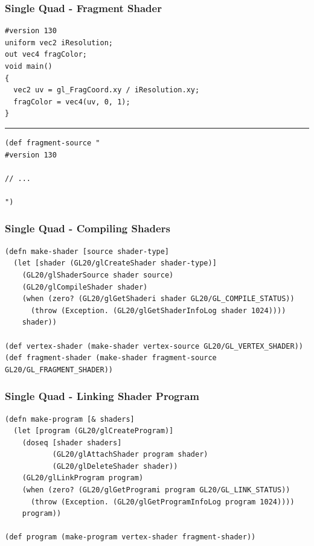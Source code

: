 \documentclass[aspectratio=169,11pt,xcolor=dvipsnames]{beamer}
\begin{document}
\begin{frame}[fragile]
  \frametitle{Single Quad {-} Fragment Shader}
  \begin{verbatim}
#version 130
uniform vec2 iResolution;
out vec4 fragColor;
void main()
{
  vec2 uv = gl_FragCoord.xy / iResolution.xy;
  fragColor = vec4(uv, 0, 1);
}
  \end{verbatim}
  \rule{\textwidth}{1pt}
  \begin{verbatim}
(def fragment-source "
#version 130

// ...

")
  \end{verbatim}
\end{frame}

\begin{frame}[fragile]
  \frametitle{Single Quad {-} Compiling Shaders}
  \begin{verbatim}
(defn make-shader [source shader-type]
  (let [shader (GL20/glCreateShader shader-type)]
    (GL20/glShaderSource shader source)
    (GL20/glCompileShader shader)
    (when (zero? (GL20/glGetShaderi shader GL20/GL_COMPILE_STATUS))
      (throw (Exception. (GL20/glGetShaderInfoLog shader 1024))))
    shader))

(def vertex-shader (make-shader vertex-source GL20/GL_VERTEX_SHADER))
(def fragment-shader (make-shader fragment-source GL20/GL_FRAGMENT_SHADER))
  \end{verbatim}
\end{frame}

\begin{frame}[fragile]
  \frametitle{Single Quad {-} Linking Shader Program}
  \begin{verbatim}
(defn make-program [& shaders]
  (let [program (GL20/glCreateProgram)]
    (doseq [shader shaders]
           (GL20/glAttachShader program shader)
           (GL20/glDeleteShader shader))
    (GL20/glLinkProgram program)
    (when (zero? (GL20/glGetProgrami program GL20/GL_LINK_STATUS))
      (throw (Exception. (GL20/glGetProgramInfoLog program 1024))))
    program))

(def program (make-program vertex-shader fragment-shader))
  \end{verbatim}
\end{frame}
\end{document}
